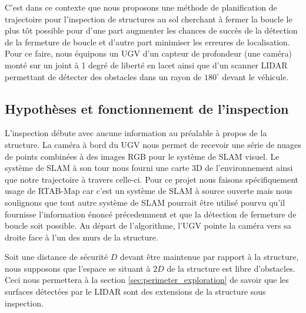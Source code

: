 C'est dans ce contexte que nous proposons une méthode de planification de trajectoire pour l'inspection de structures au sol cherchant à fermer la boucle le plus tôt possible pour d'une part augmenter les chances de succès de la détection de la fermeture de boucle et d'autre part minimiser les erreures de localisation. Pour ce faire, nous équipons un UGV d'un capteur de profondeur (une caméra) monté sur un joint à 1 degré de liberté en lacet ainsi que d'un scanner LIDAR permettant de détecter des obstacles dans un rayon de $180^\circ$ devant le véhicule.



\subsection{Hypothèses et fonctionnement de l'inspection}

L'inspection débute avec aucune information au préalable à propos de la structure. La caméra à bord du UGV nous permet de recevoir une série de nuages de points combinées à des images RGB pour le système de SLAM visuel. Le système de SLAM à son tour nous fourni une carte 3D de l'environnement ainsi que notre trajectoire à travers celle-ci. Pour ce projet nous faisons spécifiquement usage de RTAB-Map \citep{Labbe2014} car c'est un système de SLAM à source ouverte mais nous soulignons que tout autre système de SLAM pourrait être utilisé pourvu qu'il fournisse l'information énoncé précedemment et que la détection de fermeture de boucle soit possible. Au départ de l'algorithme, l'UGV pointe la caméra vers sa droite face à l'un des murs de la structure.

Soit une distance de sécurité $D$ devant être maintenue par rapport à la structure, nous supposons que l'espace se situant à $2D$ de la structure est libre d'obstacles. Ceci nous permettera à la section \ref{sec:perimeter_exploration} de savoir que les surfaces détectées par le LIDAR sont des extensions de la structure sous inspection.

